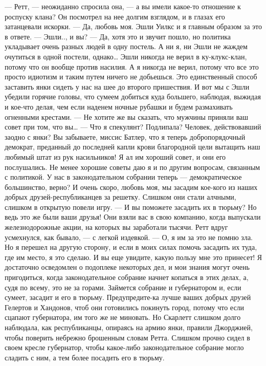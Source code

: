 — Ретт, — неожиданно спросила она, — а вы имели какое-то отношение к роспуску клана?
Он посмотрел на нее долгим взглядом, и в глазах его затанцевали искорки.
— Да, любовь моя. Эшли Уилкс и я главным образом за это в ответе.
— Эшли.., и вы?
— Да, хотя это и звучит пошло, но политика укладывает очень разных людей в одну постель. А ни я, ни Эшли не жаждем очутиться в одной постели, однако… Эшли никогда не верил в ку-клукс-клан, потому что он вообще против насилия. А я никогда не верил, потому что все это просто идиотизм и таким путем ничего не добьешься. Это единственный способ заставить янки сидеть у нас на шее до второго пришествия. И вот мы с Эшли убедили горячие головы, что сумеем добиться куда большего, наблюдая, выжидая и кое-что делая, чем если наденем ночные рубашки и будем размахивать огненными крестами.
— Не хотите же вы сказать, что мужчины приняли ваш совет при том, что вы…
— Что я спекулянт? Подлипала? Человек, действовавший заодно с янки? Вы забываете, миссис Батлер, что я теперь добропорядочный демократ, преданный до последней капли крови благородной цели вытащить наш любимый штат из рук насильников! Я ал им хороший совет, и они его послушались. Не менее хорошие советы даю я и по другим вопросам, связанным с политикой. У нас в законодательном собрании теперь — демократическое большинство, верно? И очень скоро, любовь моя, мы засадим кое-кого из наших добрых друзей-республиканцев за решетку. Слишком они стали алчными, слишком в открытую повели игру.
— И вы поможете засадить их в тюрьму? Но ведь это же были ваши друзья! Они взяли вас в свою компанию, когда выпускали железнодорожные акции, на которых вы заработали тысячи.
Ретт вдруг усмехнулся, как бывало, — с легкой издевкой.
— О, я им за это не помню зла. Но я перешел на другую сторону, и если в моих силах помочь засадить их туда, где им место, я это сделаю. И вы еще увидите, какую пользу мне это принесет! Я достаточно осведомлен о подоплеке некоторых дел, и мои знания могут очень пригодиться, когда законодательное собрание начнет копаться в этих делах, а, судя по всему, это не за горами. Займется собрание и губернатором и, если сумеет, засадит и его в тюрьму. Предупредите-ка лучше ваших добрых друзей Гелертов и Хандонов, чтоб они готовились покинуть город, потому что если сцапают губернатора, им того же не миновать.
Но Скарлетт слишком долго наблюдала, как республиканцы, опираясь на армию янки, правили Джорджией, чтобы поверить небрежно брошенным словам Ретта. Слишком прочно сидел в своем кресле губернатор, чтобы какое-либо законодательное собрание могло сладить с ним, а тем более посадить его в тюрьму.
